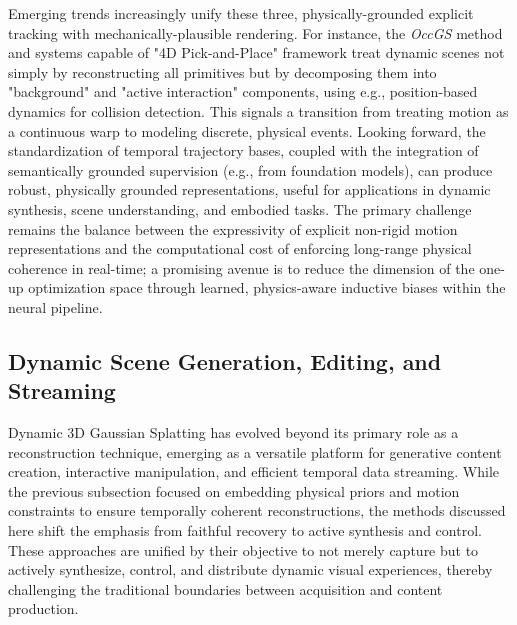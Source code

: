 \documentclass[11pt,a4paper]{article}
\begin{document}
Emerging trends increasingly unify these three, physically-grounded explicit tracking with mechanically-plausible rendering. For instance, the \emph{OccGS} method \cite{arxiv:2509.24421v5} and systems capable of "4D Pick-and-Place" framework \cite{arxiv:2410.12262v2} treat dynamic scenes not simply by reconstructing all primitives but by decomposing them into "background" and "active interaction" components, using e.g., position-based dynamics for collision detection. This signals a transition from treating motion as a continuous warp to modeling discrete, physical events. Looking forward, the standardization of temporal trajectory bases, coupled with the integration of semantically grounded supervision (e.g., from foundation models), can produce robust, physically grounded representations, useful for applications in dynamic synthesis, scene understanding, and embodied tasks. The primary challenge remains the balance between the expressivity of explicit non-rigid motion representations and the computational cost of enforcing long-range physical coherence in real-time; a promising avenue is to reduce the dimension of the one-up optimization space through learned, physics-aware inductive biases within the neural pipeline.

\cite{arxiv:1910.13186v3}


\subsection{Dynamic Scene Generation, Editing, and Streaming}


Dynamic 3D Gaussian Splatting has evolved beyond its primary role as a reconstruction technique, emerging as a versatile platform for generative content creation, interactive manipulation, and efficient temporal data streaming. While the previous subsection focused on embedding physical priors and motion constraints to ensure temporally coherent reconstructions, the methods discussed here shift the emphasis from faithful recovery to active synthesis and control. These approaches are unified by their objective to not merely capture but to actively synthesize, control, and distribute dynamic visual experiences, thereby challenging the traditional boundaries between acquisition and content production.
\end{document}
